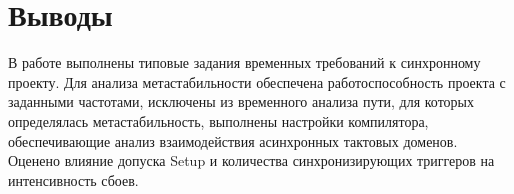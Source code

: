 \section{Выводы}

В работе выполнены типовые задания временных требований к синхронному проекту. Для анализа метастабильности обеспечена работоспособность проекта с заданными частотами, исключены из временного анализа пути, для которых определялась метастабильность, выполнены настройки компилятора, обеспечивающие анализ взаимодействия асинхронных тактовых доменов. Оценено влияние допуска Setup и количества синхронизирующих триггеров на интенсивность сбоев.

